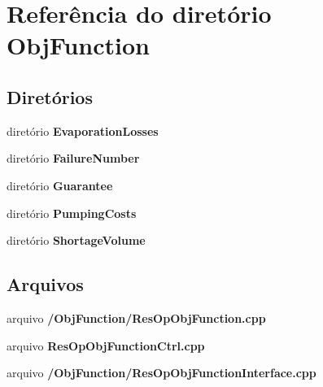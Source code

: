 \section{Referência do diretório Obj\+Function}
\label{dir_5608665753df0d9427f71beabc2f5bec}
\subsection*{Diretórios}
\begin{DoxyCompactItemize}
\item 
diretório {\bf Evaporation\+Losses}
\item 
diretório {\bf Failure\+Number}
\item 
diretório {\bf Guarantee}
\item 
diretório {\bf Pumping\+Costs}
\item 
diretório {\bf Shortage\+Volume}
\end{DoxyCompactItemize}
\subsection*{Arquivos}
\begin{DoxyCompactItemize}
\item 
arquivo {\bf /\+Obj\+Function/\+Res\+Op\+Obj\+Function.\+cpp}
\item 
arquivo {\bf Res\+Op\+Obj\+Function\+Ctrl.\+cpp}
\item 
arquivo {\bf /\+Obj\+Function/\+Res\+Op\+Obj\+Function\+Interface.\+cpp}
\end{DoxyCompactItemize}
